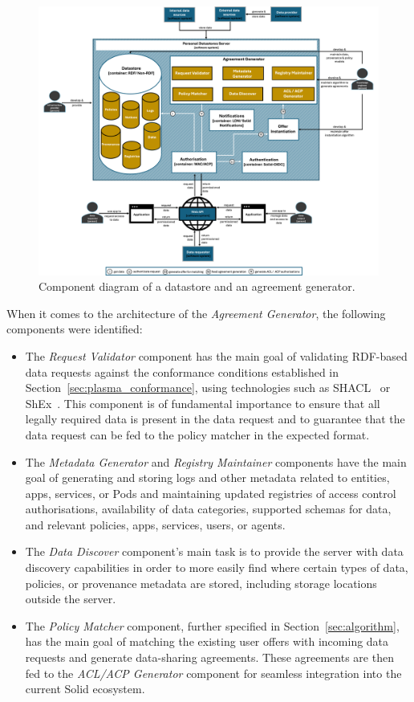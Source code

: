 \begin{figure}[t]
    \centering
    \includegraphics[width=1.1\linewidth]{figures//chapter-6/component.png}
    \caption{Component diagram of a datastore and an agreement generator.}
    \label{fig:c4-component}
\end{figure}

When it comes to the architecture of the \textit{Agreement Generator}, the following components were identified:

\begin{itemize}
    \item The \textit{Request Validator} component has the main goal of validating RDF-based data requests against the conformance conditions established in Section~\ref{sec:plasma_conformance}, using technologies such as SHACL~\citep{knublauch_shapes_2017} or ShEx~\citep{prudhommeaux_shape_2019}. This component is of fundamental importance to ensure that all legally required data is present in the data request and to guarantee that the data request can be fed to the policy matcher in the expected format.
    \item The \textit{Metadata Generator} and \textit{Registry Maintainer} components have the main goal of generating and storing logs and other metadata related to entities, apps, services, or Pods and maintaining updated registries of access control authorisations, availability of data categories, supported schemas for data, and relevant policies, apps, services, users, or agents.
    \item The \textit{Data Discover} component's main task is to provide the server with data discovery capabilities in order to more easily find where certain types of data, policies, or provenance metadata are stored, including storage locations outside the server.
    \item The \textit{Policy Matcher} component, further specified in Section~\ref{sec:algorithm}, has the main goal of matching the existing user offers with incoming data requests and generate data-sharing agreements. These agreements are then fed to the \textit{ACL/ACP Generator} component for seamless integration into the current Solid ecosystem.
\end{itemize}

